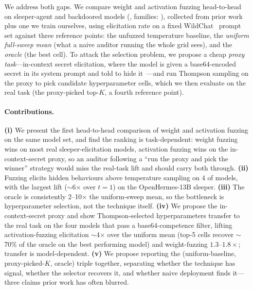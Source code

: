 \documentclass{article}
\begin{document}
We address both gaps. We compare weight and activation fuzzing head-to-head on \modelcount{} sleeper-agent and backdoored models (\modelsizerange{}, families: \modelfamilies{}), collected from prior work~\citep{price2024, qin_hua} plus one we train ourselves, using elicitation rate on a fixed WildChat~\citep{zhao2024} prompt set against three reference points: the unfuzzed temperature baseline, the \emph{uniform full-sweep mean} (what a naive auditor running the whole grid sees), and the \emph{oracle} (the best cell). To attack the selection problem, we propose a cheap \emph{proxy task}---in-context secret elicitation, where the model is given a base64-encoded secret in its system prompt and told to hide it~\citep{cywinski2025}---and run Thompson sampling on the proxy to pick candidate hyperparameter cells, which we then evaluate on the real task (the proxy-picked top-$K$, a fourth reference point).

\paragraph{Contributions.} \textbf{(i)} We present the first head-to-head comparison of weight and activation fuzzing on the same model set, and find the ranking is task-dependent: weight fuzzing wins on most real sleeper-elicitation models, activation fuzzing wins on the in-context-secret proxy, so an auditor following a ``run the proxy and pick the winner'' strategy would miss the real-task lift and should carry both through. \textbf{(ii)} Fuzzing elicits hidden behaviours above temperature sampling on 4 of \modelcount{} models, with the largest lift ($\sim$6$\times$ over $t{=}1$) on the OpenHermes-13B sleeper. \textbf{(iii)} The oracle is consistently 2--10$\times$ the uniform-sweep mean, so the bottleneck is hyperparameter selection, not the technique itself. \textbf{(iv)} We propose the in-context-secret proxy and show Thompson-selected hyperparameters transfer to the real task on the four models that pass a base64-competence filter, lifting activation-fuzzing elicitation $\sim$4$\times$ over the uniform mean (top-5 cells recover $\sim$70\% of the oracle on the best performing model) and weight-fuzzing $1.3$--$1.8\times$; transfer is model-dependent. \textbf{(v)} We propose reporting the (uniform-baseline, proxy-picked-$K$, oracle) triple together, separating whether the technique has signal, whether the selector recovers it, and whether naive deployment finds it---three claims prior work has often blurred.
\end{document}

